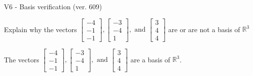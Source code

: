 \begin{exercise}
  \begin{exerciseTitle}V6 - Basis verification (ver. 609)\end{exerciseTitle}
  \begin{exerciseStatement}
    Explain why the vectors \(\left[\begin{array}{r}
-4 \\
-1 \\
-1
\end{array}\right] , \left[\begin{array}{r}
-3 \\
-4 \\
1
\end{array}\right] , \text{ and } \left[\begin{array}{r}
3 \\
4 \\
4
\end{array}\right]\) are or are not a basis of \(\mathbb{R}^3\)	


  \end{exerciseStatement}
  \begin{exerciseAnswer}
   The vectors \(\left[\begin{array}{r}
-4 \\
-1 \\
-1
\end{array}\right] , \left[\begin{array}{r}
-3 \\
-4 \\
1
\end{array}\right] , \text{ and } \left[\begin{array}{r}
3 \\
4 \\
4
\end{array}\right]\) 
  	 are  a basis of \(\mathbb{R}^3\).
  


  \end{exerciseAnswer}
\end{exercise}